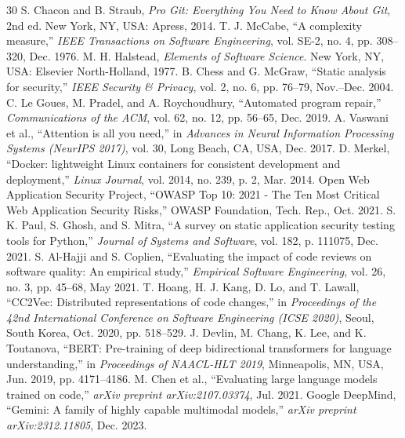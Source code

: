 \documentclass[12pt,a4paper,oneside]{report}
\begin{document}
\begin{thebibliography}{30}
 S. Chacon and B. Straub, \textit{Pro Git: Everything You Need to Know About Git}, 2nd ed. New York, NY, USA: Apress, 2014.
 T. J. McCabe, ``A complexity measure,'' \textit{IEEE Transactions on Software Engineering}, vol. SE-2, no. 4, pp. 308--320, Dec. 1976.
 M. H. Halstead, \textit{Elements of Software Science}. New York, NY, USA: Elsevier North-Holland, 1977.
 B. Chess and G. McGraw, ``Static analysis for security,'' \textit{IEEE Security \& Privacy}, vol. 2, no. 6, pp. 76--79, Nov.--Dec. 2004.
 C. Le Goues, M. Pradel, and A. Roychoudhury, ``Automated program repair,'' \textit{Communications of the ACM}, vol. 62, no. 12, pp. 56--65, Dec. 2019.
 A. Vaswani et al., ``Attention is all you need,'' in \textit{Advances in Neural Information Processing Systems (NeurIPS 2017)}, vol. 30, Long Beach, CA, USA, Dec. 2017.
 D. Merkel, ``Docker: lightweight Linux containers for consistent development and deployment,'' \textit{Linux Journal}, vol. 2014, no. 239, p. 2, Mar. 2014.
 Open Web Application Security Project, ``OWASP Top 10: 2021 - The Ten Most Critical Web Application Security Risks,'' OWASP Foundation, Tech. Rep., Oct. 2021.
 S. K. Paul, S. Ghosh, and S. Mitra, ``A survey on static application security testing tools for Python,'' \textit{Journal of Systems and Software}, vol. 182, p. 111075, Dec. 2021.
 S. Al-Hajji and S. Coplien, ``Evaluating the impact of code reviews on software quality: An empirical study,'' \textit{Empirical Software Engineering}, vol. 26, no. 3, pp. 45--68, May 2021.
 T. Hoang, H. J. Kang, D. Lo, and T. Lawall, ``CC2Vec: Distributed representations of code changes,'' in \textit{Proceedings of the 42nd International Conference on Software Engineering (ICSE 2020)}, Seoul, South Korea, Oct. 2020, pp. 518--529.
 J. Devlin, M. Chang, K. Lee, and K. Toutanova, ``BERT: Pre-training of deep bidirectional transformers for language understanding,'' in \textit{Proceedings of NAACL-HLT 2019}, Minneapolis, MN, USA, Jun. 2019, pp. 4171--4186.
 M. Chen et al., ``Evaluating large language models trained on code,'' \textit{arXiv preprint arXiv:2107.03374}, Jul. 2021.
 Google DeepMind, ``Gemini: A family of highly capable multimodal models,'' \textit{arXiv preprint arXiv:2312.11805}, Dec. 2023.

\end{thebibliography}
\end{document}
